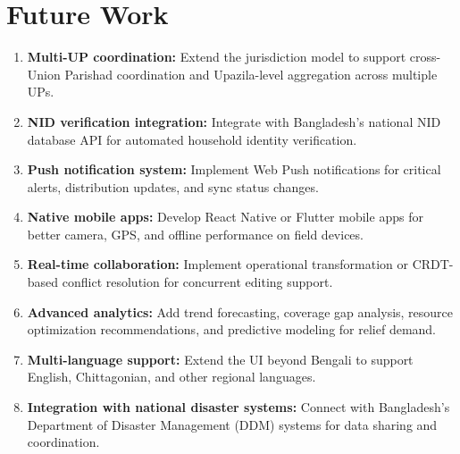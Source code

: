\section{Future Work}

\begin{enumerate}[leftmargin=1.2cm]
    \item \textbf{Multi-UP coordination:} Extend the jurisdiction model to support cross-Union Parishad coordination and Upazila-level aggregation across multiple UPs.

    \item \textbf{NID verification integration:} Integrate with Bangladesh's national NID database API for automated household identity verification.

    \item \textbf{Push notification system:} Implement Web Push notifications for critical alerts, distribution updates, and sync status changes.

    \item \textbf{Native mobile apps:} Develop React Native or Flutter mobile apps for better camera, GPS, and offline performance on field devices.

    \item \textbf{Real-time collaboration:} Implement operational transformation or CRDT-based conflict resolution for concurrent editing support.

    \item \textbf{Advanced analytics:} Add trend forecasting, coverage gap analysis, resource optimization recommendations, and predictive modeling for relief demand.

    \item \textbf{Multi-language support:} Extend the UI beyond Bengali to support English, Chittagonian, and other regional languages.

    \item \textbf{Integration with national disaster systems:} Connect with Bangladesh's Department of Disaster Management (DDM) systems for data sharing and coordination.
\end{enumerate}
